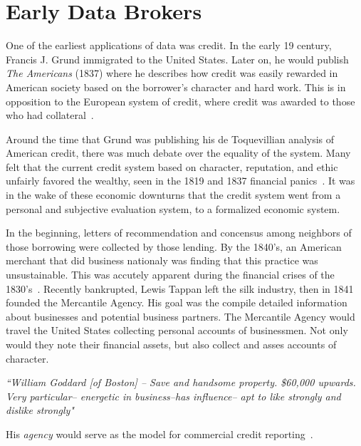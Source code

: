 \section{Early Data Brokers}

One of the earliest applications of data was credit. In the early 19
century, Francis J. Grund immigrated to the United States. Later on, he would
publish \textit{The Americans} (1837) where he describes how credit was easily
rewarded in American society based on the borrower's character and hard work.
This is in opposition to the European system of credit, where credit was
awarded to those who had collateral~\cite{lauer2017creditworthy}.

Around the time that Grund was publishing his de Toquevillian analysis of
American credit, there was much debate over the equality of the system.
Many felt that the current credit system based on character, reputation, and
ethic unfairly favored the wealthy, seen in the 1819 and 1837 financial
panics~\cite{lauer2017creditworthy}.  It was in the wake of these economic
downturns that the credit system went from a personal and subjective evaluation
system, to a formalized economic system.

In the beginning, letters of recommendation and concensus among neighbors of
those borrowing were collected by those lending. By the 1840's, an American
merchant that did business nationaly was finding that this practice was
unsustainable. This was accutely apparent during the financial crises of the
1830's~\cite{lauer2017creditworthy}. Recently bankrupted, Lewis Tappan left the
silk industry, then in 1841 founded the Mercantile Agency. His goal was the
compile detailed information about businesses and potential business partners.
The Mercantile Agency would travel the United States collecting personal accounts
of businessmen. Not only would they note their financial assets, but also
collect and asses accounts of character.

\begin{center} \textit{
		``William Goddard [of Boston] -- Save and handsome property. \$60,000 upwards.
		Very particular-- energetic in business--has influence-- apt to like strongly
		and dislike strongly"}
\end{center}

His \textit{agency} would serve as the model for commercial credit
reporting~\cite{lauer2017creditworthy}.




